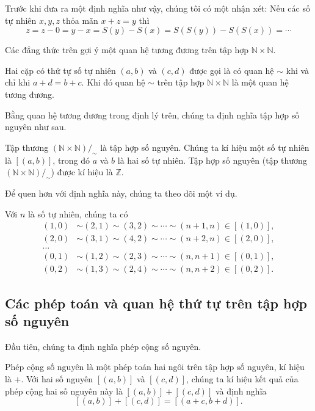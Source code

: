 Trước khi đưa ra một định nghĩa như vậy, chúng tôi có một nhận xét: Nếu các số tự nhiên $x, y, z$ thỏa mãn $x + z = y$ thì
\[
    z = z - 0 = y - x = S(y) - S(x) = S(S(y)) - S(S(x)) = \cdots
\]

Các đẳng thức trên gợi ý một quan hệ tương đương trên tập hợp $\mathbb{N}\times\mathbb{N}$.
\begin{theorem}\label{theorem:equivalence-relation-between-pairs-of-natural-numbers}
    Hai cặp có thứ tự số tự nhiên $(a, b)$ và $(c, d)$ được gọi là có quan hệ $\sim$ khi và chỉ khi $a + d = b + c$. Khi đó quan hệ $\sim$ trên tập hợp $\mathbb{N}\times\mathbb{N}$ là một quan hệ tương đương.
\end{theorem}

Bằng quan hệ tương đương trong định lý trên, chúng ta định nghĩa tập hợp số nguyên như sau.
\begin{definition}
    Tập thương $(\mathbb{N}\times\mathbb{N})/_{\sim}$ là tập hợp số nguyên. Chúng ta kí hiệu một số tự nhiên là $[(a, b)]$, trong đó $a$ và $b$ là hai số tự nhiên. Tập hợp số nguyên (tập thương $(\mathbb{N}\times\mathbb{N})/_{\sim}$) được kí hiệu là $\mathbb{Z}$.
\end{definition}

Để quen hơn với định nghĩa này, chúng ta theo dõi một ví dụ.
\begin{example}
    Với $n$ là số tự nhiên, chúng ta có
    \begin{align*}
        (1, 0) & \sim (2, 1) \sim (3, 2) \sim \cdots \sim (n+1, n) \in [(1, 0)], \\
        (2, 0) & \sim (3, 1) \sim (4, 2) \sim \cdots \sim (n+2, n) \in [(2, 0)], \\
        \ldots                                                                   \\
        (0, 1) & \sim (1, 2) \sim (2, 3) \sim \cdots \sim (n, n+1) \in [(0, 1)], \\
        (0, 2) & \sim (1, 3) \sim (2, 4) \sim \cdots \sim (n, n+2) \in [(0, 2)].
    \end{align*}
\end{example}

\subsection{Các phép toán và quan hệ thứ tự trên tập hợp số nguyên}

Đầu tiên, chúng ta định nghĩa phép cộng số nguyên.
\begin{definition}\label{definition:integer-addition}
    Phép cộng số nguyên là một phép toán hai ngôi trên tập hợp số nguyên, kí hiệu là $+$. Với hai số nguyên $[(a, b)]$ và $[(c, d)]$, chúng ta kí hiệu kết quả của phép cộng hai số nguyên này là $[(a, b)] + [(c, d)]$ và định nghĩa
    \[
        [(a, b)] + [(c, d)] = [(a+c, b+d)].
    \]
\end{definition}

